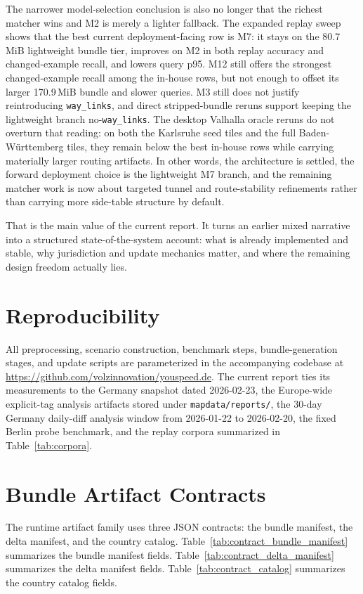 \documentclass{article}
\begin{document}
The narrower model-selection conclusion is also no longer that the richest matcher wins and M2 is merely a lighter fallback. The expanded replay sweep shows that the best current deployment-facing row is M7: it stays on the 80.7\,MiB lightweight bundle tier, improves on M2 in both replay accuracy and changed-example recall, and lowers query p95. M12 still offers the strongest changed-example recall among the in-house rows, but not enough to offset its larger 170.9\,MiB bundle and slower queries. M3 still does not justify reintroducing \texttt{way\_links}, and direct stripped-bundle reruns support keeping the lightweight branch no-\texttt{way\_links}. The desktop Valhalla oracle reruns do not overturn that reading: on both the Karlsruhe seed tiles and the full Baden-W\"urttemberg tiles, they remain below the best in-house rows while carrying materially larger routing artifacts. In other words, the architecture is settled, the forward deployment choice is the lightweight M7 branch, and the remaining matcher work is now about targeted tunnel and route-stability refinements rather than carrying more side-table structure by default.

That is the main value of the current report. It turns an earlier mixed narrative into a structured state-of-the-system account: what is already implemented and stable, why jurisdiction and update mechanics matter, and where the remaining design freedom actually lies.

\section*{Reproducibility}
All preprocessing, scenario construction, benchmark steps, bundle-generation stages, and update scripts are parameterized in the accompanying codebase at \url{https://github.com/volzinnovation/youspeed.de}. The current report ties its measurements to the Germany snapshot dated 2026-02-23, the Europe-wide explicit-tag analysis artifacts stored under \texttt{mapdata/reports/}, the 30-day Germany daily-diff analysis window from 2026-01-22 to 2026-02-20, the fixed Berlin probe benchmark, and the replay corpora summarized in Table~\ref{tab:corpora}.

\appendix

\section{Bundle Artifact Contracts}
The runtime artifact family uses three JSON contracts: the bundle manifest, the delta manifest, and the country catalog. Table~\ref{tab:contract_bundle_manifest} summarizes the bundle manifest fields. Table~\ref{tab:contract_delta_manifest} summarizes the delta manifest fields. Table~\ref{tab:contract_catalog} summarizes the country catalog fields.
\end{document}

